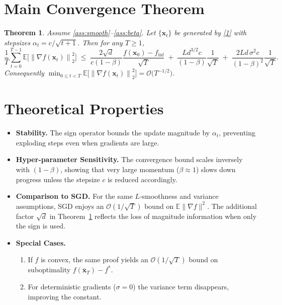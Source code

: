 \documentclass[11pt]{article}
\newtheorem{theorem}{Theorem}
\newcommand{\E}{\mathbb{E}}
\newcommand{\norm}[1]{\left\lVert#1\right\rVert}
\begin{document}
\section*{Main Convergence Theorem}
\begin{theorem}\label{thm:main}
Assume \ref{ass:smooth}–\ref{ass:beta}. Let $\{\bm{x}_{t}\}$ be generated by \eqref{1} with stepsizes $\alpha_{t}=c/\sqrt{t+1}$. Then for any $T\ge1$,
\[
\frac{1}{T}\sum_{t=0}^{T-1}\E\!\big[\norm{\nabla f(\bm{x}_{t})}_{2}^{2}\big]\;
\le\;
\frac{2\sqrt{d}}{c(1-\beta)}\frac{f(\bm{x}_{0})-f_{\inf}}{\sqrt{T}}
\;+\;
\frac{L d^{3/2}c}{(1-\beta)}\frac{1}{\sqrt{T}} 
\;+\;
\frac{2L d\,\sigma^{2}c}{(1-\beta)^{2}}\frac{1}{\sqrt{T}} .
\]
Consequently $\displaystyle\min_{0\le t<T}\E\!\big[\norm{\nabla f(\bm{x}_{t})}_{2}^{2}\big]=\mathcal{O}\!\big(T^{-1/2}\big)$.
\end{theorem}

\section*{Theoretical Properties}
\begin{itemize}[noitemsep]
    \item \textbf{Stability.} The sign operator bounds the update magnitude by $\alpha_{t}$, preventing exploding steps even when gradients are large.
    \item \textbf{Hyper‑parameter Sensitivity.} The convergence bound scales inversely with $(1-\beta)$, showing that very large momentum ($\beta\approx1$) slows down progress unless the stepsize $c$ is reduced accordingly.
    \item \textbf{Comparison to SGD.} For the same $L$‑smoothness and variance assumptions, SGD enjoys an $\mathcal{O}(1/\sqrt{T})$ bound on $\E\|\nabla f\|^{2}$. The additional factor $\sqrt{d}$ in Theorem~\ref{thm:main} reflects the loss of magnitude information when only the sign is used.
    \item \textbf{Special Cases.}
    \begin{enumerate}[label=(\alph*),noitemsep]
        \item If $f$ is convex, the same proof yields an $\mathcal{O}(1/\sqrt{T})$ bound on suboptimality $f(\bar{\bm{x}}_{T})-f^{*}$.
        \item For deterministic gradients ($\sigma=0$) the variance term disappears, improving the constant.
    \end{enumerate}
\end{itemize}
\end{document}
